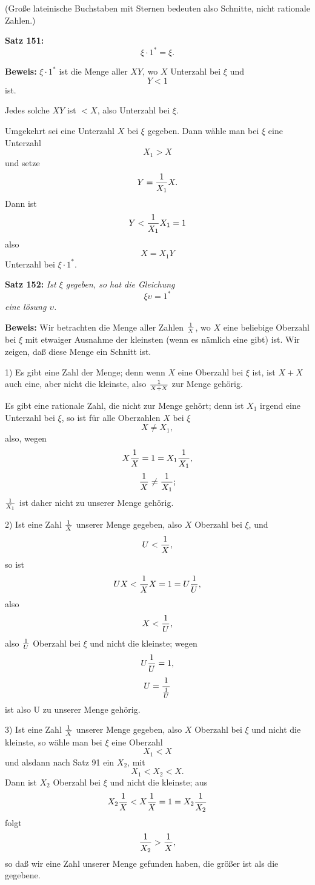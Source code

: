 (Gro{\ss}e lateinische Buchstaben mit Sternen bedeuten also Schnitte,
nicht rationale Zahlen.)
\medskip


{\bf Satz 151:} {\it $$\xi \cdot 1^* = \xi.$$}%

{\bf Beweis:} $\xi \cdot 1^*$ ist die Menge aller $XY$, wo $X$ Unterzahl bei
$\xi$ und
$$Y < 1$$
ist.

Jedes solche $XY$ ist $< X$, also Unterzahl bei $\xi$.

Umgekehrt sei eine Unterzahl $X$ bei $\xi$ gegeben.  Dann w\"ahle
man bei $\xi$ eine Unterzahl
$$X_1 > X$$
und setze
$$Y = {1 \over X_1}X.$$
Dann ist
$$Y < {1 \over X_1}X_1 = 1$$
also
$$X = X_1 Y$$
Unterzahl bei $\xi \cdot 1^*$.
\medskip


{\bf Satz 152:} {\it Ist $\xi$ gegeben, so hat die Gleichung
$$\xi\upsilon = 1^*$$
eine l\"osung $\upsilon$.}

{\bf Beweis:} Wir betrachten die Menge aller Zahlen $1 \over X$, wo $X$
eine beliebige Oberzahl bei $\xi$ mit etwaiger Ausnahme der kleinsten
(wenn es n\"amlich eine gibt) ist.  Wir zeigen, da{\ss} diese Menge ein
Schnitt ist.

1) Es gibt eine Zahl der Menge; denn wenn $X$ eine Oberzahl
bei $\xi$ ist, ist $X + X$ auch eine, aber nicht die kleinste, also $1 \over X + X$
zur Menge geh\"orig.

Es gibt eine rationale Zahl, die nicht zur Menge geh\"ort; denn
ist $X_1$ irgend eine Unterzahl bei $\xi$, so ist f\"ur alle Oberzahlen $X$
bei $\xi$
$$X \ne X_1,$$
also, wegen
$$X{1 \over X} = 1 = X_1{1 \over X_1},$$
$${1 \over X} \ne {1 \over X_1};$$
$1 \over X_1$ ist daher nicht zu unserer Menge geh\"orig.

2) Ist eine Zahl $1 \over X$ unserer Menge gegeben, also $X$ Oberzahl
bei $\xi$, und
$$U < {1 \over X},$$
so ist
$$UX < {1 \over X}X = 1 = U{1 \over U},$$
also
$$X < {1 \over U},$$
also $1 \over U$ Oberzahl bei $\xi$ und nicht die kleinste; wegen
$$U{1 \over U} = 1,$$
$$U = {1 \over {1 \over U}}$$
ist also U zu unserer Menge geh\"orig.

3) Ist eine Zahl $1 \over X$ unserer Menge gegeben, also $X$ Oberzahl
bei $\xi$ und nicht die kleinste, so w\"ahle man bei $\xi$ eine Oberzahl
$$X_1 < X$$
und alsdann nach Satz 91 ein $X_2$, mit
$$X_1 < X_2 < X.$$
Dann ist $X_2$ Oberzahl bei $\xi$ und nicht die kleinste; aus
$$X_2{1 \over X} < X{1 \over X} = 1 = X_2{1 \over X_2}$$
folgt
$${1 \over X_2} > {1 \over X},$$
so da{\ss} wir eine Zahl unserer Menge gefunden haben, die gr\"o{\ss}er
ist als die gegebene.

